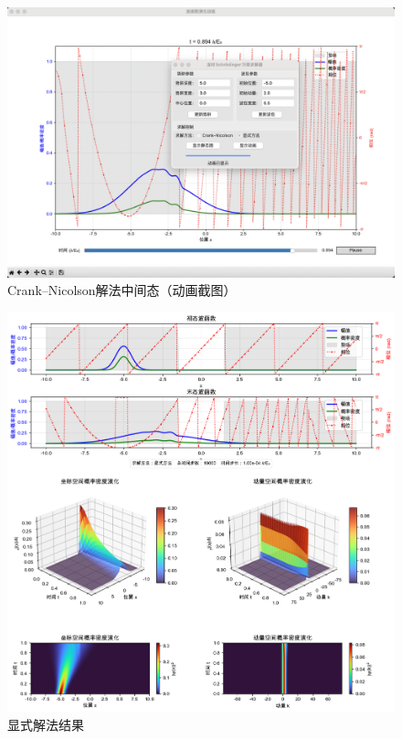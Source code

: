 \begin{figure}[H]
    \centering
    \includegraphics[width=1.0\textwidth]{Problem_2/figs/cn_anim.png}
    \caption{Crank–Nicolson解法中间态（动画截图）}
\end{figure}

\begin{figure}[H]
    \centering
    \includegraphics[width=1.0\textwidth]{Problem_2/figs/ex_result.png}
    \caption{显式解法结果}
\end{figure}